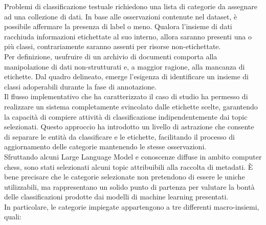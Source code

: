 Problemi di classificazione testuale richiedono una lista di categorie da assegnare ad una collezione di dati. In base alle osservazioni contenute nel dataset, è possibile affermare la presenza di label o meno. Qualora l'insieme di dati racchiuda informazioni etichettate al suo interno, allora saranno presenti una o più classi, contrariamente saranno assenti per risorse non-etichettate. \vspace{7pt} \\
Per definizione, usufruire di un archivio di documenti comporta alla manipolazione di dati non-strutturati e, a maggior ragione, alla mancanza di etichette. Dal quadro delineato, emerge l'esigenza di identificare un insieme di classi adoperabili durante la fase di annotazione. \vspace{7pt} \\
Il flusso implementativo che ha caratterizzato il caso di studio ha permesso di realizzare un sistema completamente svincolato dalle etichette scelte, garantendo la capacità di compiere attività di classificazione indipendentemente dai topic selezionati. Questo approccio ha introdotto un livello di astrazione che consente di separare le entità da classificare e le etichette, facilitando il processo di aggiornamento delle categorie mantenendo le stesse osservazioni. \vspace{7pt} \\
Sfruttando alcuni Large Language Model e conoscenze diffuse in ambito computer chess, sono stati selezionati alcuni topic attribuibili alla raccolta di metadati. È bene precisare che le categorie selezionate non pretendono di essere le uniche utilizzabili, ma rappresentano un solido punto di partenza per valutare la bontà delle classificazioni prodotte dai modelli di machine learning presentati. \vspace{7pt} \\
In particolare, le categorie impiegate appartengono a tre differenti macro-insiemi, quali:
